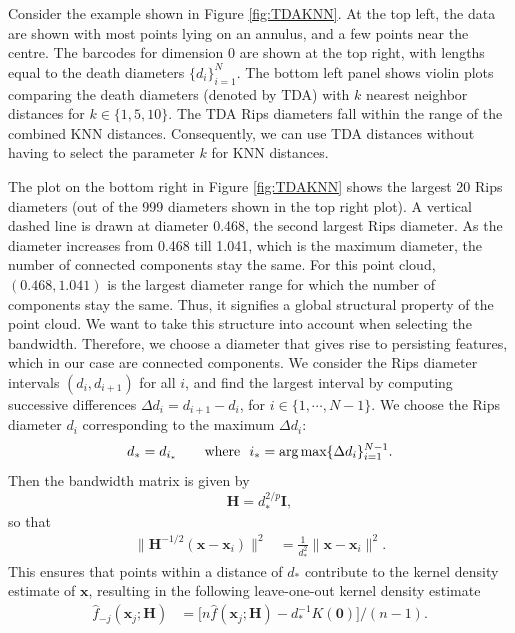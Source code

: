 \documentclass[11pt,a4paper,]{article}
\newcommand{\argmax}{\mathop{\text{arg\,max}}}
\theoremstyle{definition}
\theoremstyle{definition}
\theoremstyle{definition}
\theoremstyle{remark}
\begin{document}
Consider the example shown in Figure \ref{fig:TDAKNN}. At the top left, the data are shown with most points lying on an annulus, and a few points near the centre. The barcodes for dimension 0 are shown at the top right, with lengths equal to the death diameters \(\{d_i\}_{i = 1}^N\). The bottom left panel shows violin plots comparing the death diameters (denoted by TDA) with \(k\) nearest neighbor distances for \(k \in \{1, 5, 10\}\). The TDA Rips diameters fall within the range of the combined KNN distances. Consequently, we can use TDA distances without having to select the parameter \(k\) for KNN distances.

The plot on the bottom right in Figure \ref{fig:TDAKNN} shows the largest 20 Rips diameters (out of the 999 diameters shown in the top right plot). A vertical dashed line is drawn at diameter 0.468, the second largest Rips diameter. As the diameter increases from 0.468 till 1.041, which is the maximum diameter, the number of connected components stay the same. For this point cloud, \((0.468, 1.041)\) is the largest diameter range for which the number of components stay the same. Thus, it signifies a global structural property of the point cloud. We want to take this structure into account when selecting the bandwidth. Therefore, we choose a diameter that gives rise to persisting features, which in our case are connected components. We consider the Rips diameter intervals \((d_i, d_{i+1})\) for all \(i\), and find the largest interval by computing successive differences
\(\Delta d_i = d_{i+1} - d_i\), for \(i \in \{1, \cdots, N-1 \}\). We choose the Rips diameter \(d_i\) corresponding to the maximum \(\Delta d_i\):
\begin{equation}\label{eq:deathrad2}
    d_* = d_{i_*} \qquad \text{where ~} i_*  = \argmax \{ \Delta d_i \}_{i=1}^{N-1}.
\end{equation}
Then the bandwidth matrix is given by
\begin{equation}\label{eq:bandwidth}
    \bm{H} = d_*^{2/p} \bm{I},
\end{equation}
so that
\begin{align}\label{eq:kde11}
    \| \bm{H}^{-1/2}(\bm{x} - \bm{x}_i) \|^2
      & = \frac{1}{d_*^2}\|\bm{x} - \bm{x}_i \|^2  .
\end{align}
This ensures that points within a distance of \(d_*\) contribute to the kernel density estimate of \(\bm{x}\), resulting in the following leave-one-out kernel density estimate
\begin{align}\label{eq:kde12}
    \hat{f}_{-j}(\bm{x}_j;\bm{H})
      & = \big[ n \hat{f}(\bm{x}_j;\bm{H}) - d_*^{-1} K(\bm{0})\big]/(n-1).
\end{align}
\end{document}
